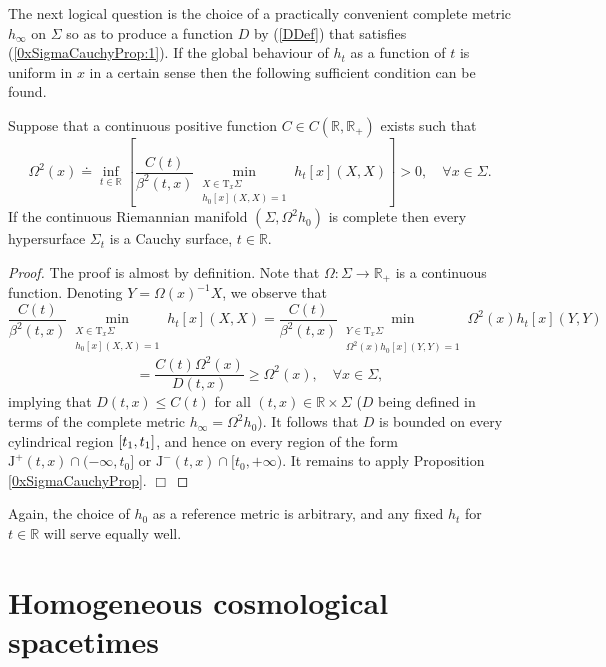 \documentclass{article}
\begin{document}
The next logical question is the choice of a practically convenient complete metric $h_\infty$ on $\Sigma$ so as to produce a function $D$ by (\ref{DDef}) that satisfies (\ref{0xSigmaCauchyProp:1}). If the global behaviour of $h_t$ as a function of $t$ is uniform in $x$ in a certain sense then the following sufficient condition can be found.

\begin{proposition}\label{COmegaProp} Suppose that a continuous positive function $C\in C(\mathbb{R},\mathbb{R}_+)$ exists such that
$$
\Omega^2(x)\doteq\inf\limits_{t\in\mathbb{R}}\left[\frac{C(t)}{\beta^2(t,x)}\min\limits_{\substack{X\in\mathrm{T}_x\Sigma\\h_0[x](X,X)=1}}h_t[x](X,X)\right]>0,\quad\forall x\in\Sigma.
$$
If the continuous Riemannian manifold $(\Sigma,\Omega^2h_0)$ is complete then every hypersurface $\Sigma_t$ is a Cauchy surface, $t\in\mathbb{R}$.
\end{proposition}
\begin{proof} The proof is almost by definition. Note that $\Omega:\Sigma\to\mathbb{R}_+$ is a continuous function. Denoting $Y=\Omega(x)^{-1}X$, we observe that
$$
\frac{C(t)}{\beta^2(t,x)}\min\limits_{\substack{X\in\mathrm{T}_x\Sigma\\h_0[x](X,X)=1}}h_t[x](X,X)=\frac{C(t)}{\beta^2(t,x)}\min\limits_{\substack{Y\in\mathrm{T}_x\Sigma\\\Omega^2(x)h_0[x](Y,Y)=1}}\Omega^2(x)h_t[x](Y,Y)
$$
$$
=\frac{C(t)\Omega^2(x)}{D(t,x)}\ge\Omega^2(x),\quad\forall x\in\Sigma,
$$
implying that $D(t,x)\le C(t)$ for all $(t,x)\in\mathbb{R}\times\Sigma$ ($D$ being defined in terms of the complete metric $h_\infty=\Omega^2h_0$). It follows that $D$ is bounded on every cylindrical region $[t_1,t_1]\time\Sigma$, and hence on every region of the form $\mathrm{J}^+(t,x)\cap(-\infty,t_0]$ or $\mathrm{J}^-(t,x)\cap[t_0,+\infty)$. It remains to apply Proposition \ref{0xSigmaCauchyProp}. $\Box$
\end{proof}

\begin{remark} Again, the choice of $h_0$ as a reference metric is arbitrary, and any fixed $h_t$ for $t\in\mathbb{R}$ will serve equally well.
\end{remark}

\section*{Homogeneous cosmological spacetimes}
\end{document}
